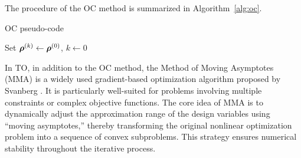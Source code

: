 \documentclass[mathpazo]{cicp}
\begin{document}
The procedure of the OC method is summarized in Algorithm~\ref{alg:oc}.
\vspace{-1ex}
\begin{algorithm}[H]
	\caption{OC pseudo-code}
	\label{alg:oc}
	\begin{minipage}{\textwidth}
		Set $\boldsymbol{\rho}^{(k)} \leftarrow \boldsymbol{\rho}^{(0)}$, $k \leftarrow 0$\;
		
	\end{minipage}
\end{algorithm}
\vspace{-1ex}

In TO, in addition to the OC method, the Method of Moving Asymptotes (MMA) is a widely used gradient-based optimization algorithm proposed by Svanberg \cite{svanberg1987method}. It is particularly well-suited for problems involving multiple constraints or complex objective functions. The core idea of MMA is to dynamically adjust the approximation range of the design variables using “moving asymptotes,” thereby transforming the original nonlinear optimization problem into a sequence of convex subproblems. This strategy ensures numerical stability throughout the iterative process.
\end{document}
